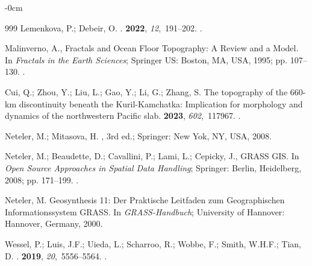 \documentclass[technologies,article,accept,pdftex,moreauthors]{Definitions/mdpi}
\begin{document}
\begin{adjustwidth}{-\extralength}{0cm}
\begin{thebibliography}{999}
	Lemenkova, P.; Debeir, O.
	.
	 {\bf 2022}, {\em
		12},~191--202.
	.
	
	Malinverno, A., Fractals and Ocean Floor Topography: A Review and a Model.
	\newblock In {\em Fractals in the Earth Sciences}; Springer US: Boston, MA, USA,
	1995; pp. 107--130.
	.
	
	Cui, Q.; Zhou, Y.; Liu, L.; Gao, Y.; Li, G.; Zhang, S.
	\newblock The topography of the 660-km discontinuity beneath the
	Kuril-Kamchatka: Implication for morphology and dynamics of the northwestern
	Pacific slab.
	 {\bf 2023}, {\em
		602},~117967.
	.
	
	Neteler, M.; Mitasova, H.
	, 3rd ed.; Springer: New Yok, NY, USA, 2008.
	
	Neteler, M.; Beaudette, D.; Cavallini, P.; Lami, L.; Cepicky, J., GRASS GIS.
	\newblock In {\em Open Source Approaches in Spatial Data Handling}; Springer: Berlin, Heidelberg,  2008; pp. 171--199.
	.
	
	Neteler, M.
	\newblock Geosynthesis 11: Der Praktische Leitfaden zum Geographischen
	Informationssystem GRASS. In \emph{GRASS-Handbuch};
	\newblock University of Hannover: Hannover, Germany, 2000. %
	
	Wessel, P.; Luis, J.F.; Uieda, L.; Scharroo, R.; Wobbe, F.; Smith, W.H.F.;
	Tian, D.
	.
	 {\bf 2019}, {\em
		20},~5556--5564.
	.
	

\end{thebibliography}
\end{adjustwidth}
\end{document}
